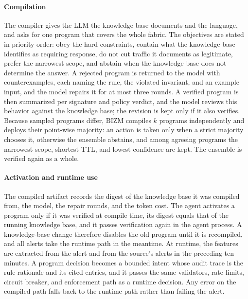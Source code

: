 \documentclass[final,5p]{elsarticle}
\begin{document}
\paragraph{Compilation}
The compiler gives the LLM the knowledge-base documents and the language, and asks for one program that covers the whole fabric. The objectives are stated in priority order: obey the hard constraints, contain what the knowledge base identifies as requiring response, do not cut traffic it documents as legitimate, prefer the narrowest scope, and abstain when the knowledge base does not determine the answer. A rejected program is returned to the model with counterexamples, each naming the rule, the violated invariant, and an example input, and the model repairs it for at most three rounds. A verified program is then summarized per signature and policy verdict, and the model reviews this behavior against the knowledge base; the revision is kept only if it also verifies. Because sampled programs differ, BIZM compiles $k$ programs independently and deploys their point-wise majority: an action is taken only when a strict majority chooses it, otherwise the ensemble abstains, and among agreeing programs the narrowest scope, shortest TTL, and lowest confidence are kept. The ensemble is verified again as a whole.

\paragraph{Activation and runtime use}
The compiled artifact records the digest of the knowledge base it was compiled from, the model, the repair rounds, and the token cost. The agent activates a program only if it was verified at compile time, its digest equals that of the running knowledge base, and it passes verification again in the agent process. A knowledge-base change therefore disables the old program until it is recompiled, and all alerts take the runtime path in the meantime. At runtime, the features are extracted from the alert and from the source's alerts in the preceding ten minutes. A program decision becomes a bounded intent whose audit trace is the rule rationale and its cited entries, and it passes the same validators, rate limits, circuit breaker, and enforcement path as a runtime decision. Any error on the compiled path falls back to the runtime path rather than failing the alert.
\end{document}
